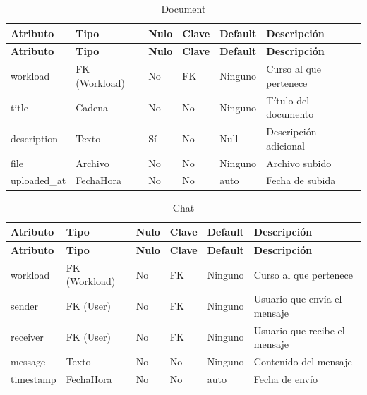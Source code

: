 \documentclass{article}
\begin{document}
\begin{longtable}{|l|l|l|l|l|l|}
\caption{Document} \\
\hline
\rowcolor{tabledictionariesbackground}
\textbf{Atributo} & \textbf{Tipo} & \textbf{Nulo} & \textbf{Clave} & \textbf{Default} & \textbf{Descripción} \\
\hline
\endfirsthead
\hline
\rowcolor{tabledictionariesbackground}
\textbf{Atributo} & \textbf{Tipo} & \textbf{Nulo} & \textbf{Clave} & \textbf{Default} & \textbf{Descripción} \\
\hline
\endhead
workload & FK (Workload) & No & FK & Ninguno & Curso al que pertenece \\
title & Cadena & No & No & Ninguno & Título del documento \\
description & Texto & Sí & No & Null & Descripción adicional \\
file & Archivo & No & No & Ninguno & Archivo subido \\
uploaded\_at & FechaHora & No & No & auto & Fecha de subida \\
\hline
\end{longtable}

\begin{longtable}{|l|l|l|l|l|l|}
\caption{Chat} \\
\hline
\rowcolor{tabledictionariesbackground}
\textbf{Atributo} & \textbf{Tipo} & \textbf{Nulo} & \textbf{Clave} & \textbf{Default} & \textbf{Descripción} \\
\hline
\endfirsthead
\hline
\rowcolor{tabledictionariesbackground}
\textbf{Atributo} & \textbf{Tipo} & \textbf{Nulo} & \textbf{Clave} & \textbf{Default} & \textbf{Descripción} \\
\hline
\endhead
workload & FK (Workload) & No & FK & Ninguno & Curso al que pertenece \\
sender & FK (User) & No & FK & Ninguno & Usuario que envía el mensaje \\
receiver & FK (User) & No & FK & Ninguno & Usuario que recibe el mensaje \\
message & Texto & No & No & Ninguno & Contenido del mensaje \\
timestamp & FechaHora & No & No & auto & Fecha de envío \\
\hline
\end{longtable}
\end{document}
